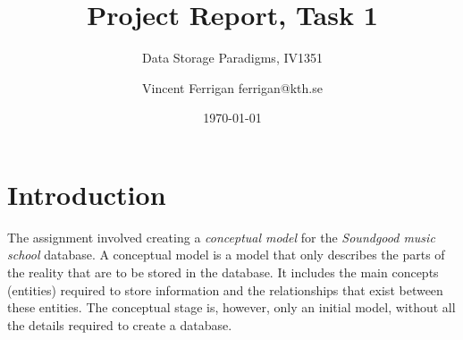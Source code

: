\documentclass[a4paper]{scrartcl}
\title{Project Report, Task 1}
\subtitle{Data Storage Paradigms, IV1351}
\author{Vincent Ferrigan ferrigan@kth.se}
\date{\today}
\begin{document}
\maketitle
    







\section{Introduction}
The assignment involved creating a 
\emph{conceptual model} 
for the 
\emph{Soundgood music school} 
database. 
A conceptual model is a model that only describes the parts of the reality that
are to be stored in the database.
It includes the main concepts (entities) required to store
information and the relationships that exist between these entities.
The conceptual stage is, however, only an initial model, without all the details required to
create a database. 
\end{document}
